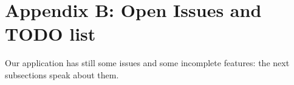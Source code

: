 \chapter{Appendix B: Open Issues and TODO list}
Our application has still some issues and some incomplete features: the next subsections speak about them.